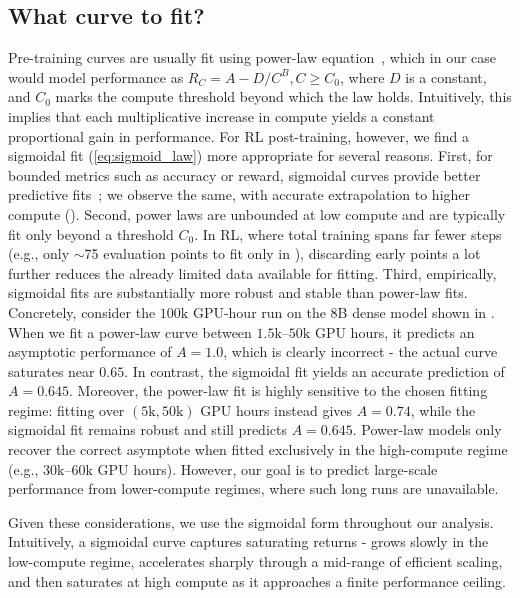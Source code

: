 \subsection{What curve to fit?} \label{appendix:curve_to_fit}
Pre-training curves are usually fit using power-law equation~\citep{misfitting,kaplan2020scaling,scalingdataconstrained}, which in our case would model performance as $R_{C} = A - D/C^B, C\geq C_0$, where $D$ is a constant, and $C_0$ marks the compute threshold beyond which the law holds.
Intuitively, this implies that each multiplicative increase in compute yields a constant proportional gain in performance.
For RL post-training, however, we find a sigmoidal fit (\cref{eq:sigmoid_law}) more appropriate for several reasons.
First, for bounded metrics such as accuracy or reward, sigmoidal curves provide better predictive fits~\citep{ruan2024,srivastava2022bigbench}; we observe the same, with accurate extrapolation to higher compute ().
Second, power laws are unbounded at low compute and are typically fit only beyond a threshold $C_0$. In RL, where total training spans far fewer steps (e.g., only $\sim$75 evaluation points to fit only in ), discarding early points a lot further reduces the already limited data available for fitting.
Third, empirically, sigmoidal fits are substantially more robust and stable than power-law fits.
Concretely, consider the $100\text{k}$ GPU-hour run on the 8B dense model shown in .
When we fit a power-law curve between $1.5\text{k}$–$50\text{k}$ GPU hours, it predicts an asymptotic performance of $A = 1.0$, which is clearly incorrect - the actual curve saturates near $0.65$.
In contrast, the sigmoidal fit yields an accurate prediction of $A = 0.645$.
Moreover, the power-law fit is highly sensitive to the chosen fitting regime: fitting over $(5\text{k}, 50\text{k})$ GPU hours instead gives $A = 0.74$, while the sigmoidal fit remains robust and still predicts $A = 0.645$.
Power-law models only recover the correct asymptote when fitted exclusively in the high-compute regime (e.g., $30\text{k}$–$60\text{k}$ GPU hours).
However, our goal is to predict large-scale performance from lower-compute regimes, where such long runs are unavailable.


Given these considerations, we use the sigmoidal form throughout our analysis. Intuitively, a sigmoidal curve captures saturating returns - grows slowly in the low-compute regime, accelerates sharply through a mid-range of efficient scaling, and then saturates at high compute as it approaches a finite performance ceiling.

